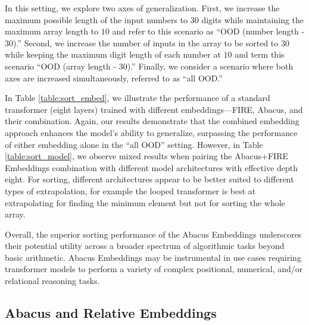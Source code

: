 \documentclass{article}
\newcommand{\tom}[1]{{\textcolor{red}{Tom: \footnotesize\sf[#1]}}}
\begin{document}
In this setting, we explore two axes of generalization.
First, we increase the maximum possible length of the input numbers to \(30\) digits while maintaining the maximum array length to \(10\) and refer to this scenario as ``OOD (number length - \(30\)).'' 
Second, we increase the number of inputs in the array to be sorted to \(30\) while keeping the maximum digit length of each number at \(10\) and term this scenario ``OOD (array length - \(30\)).'' 
Finally, we consider a scenario where both axes are increased simultaneously, referred to as ``all OOD.''

In Table \ref{table:sort_embed}, we illustrate the performance of a standard transformer (eight layers) trained with different embeddings—FIRE, Abacus, and their combination.
Again, our results demonstrate that the combined embedding approach enhances the model's ability to generalize, surpassing the performance of either embedding alone in the ``all OOD'' setting.
However, in Table \ref{table:sort_model}, we observe mixed results when pairing the Abacus+FIRE Embeddings combination with different model architectures with effective depth eight. 
For sorting, different architectures appear to be better suited to different types of extrapolation, for example the looped transformer is best at extrapolating for finding the minimum element but not for sorting the whole array.

Overall, the superior sorting performance of the Abacus Embeddings underscores their potential utility across a broader spectrum of algorithmic tasks beyond basic arithmetic. 
Abacus Embeddings may be instrumental in use cases requiring transformer models to perform a variety of complex positional, numerical, and/or relational reasoning tasks.


\subsection{Abacus and Relative Embeddings}
\end{document}
